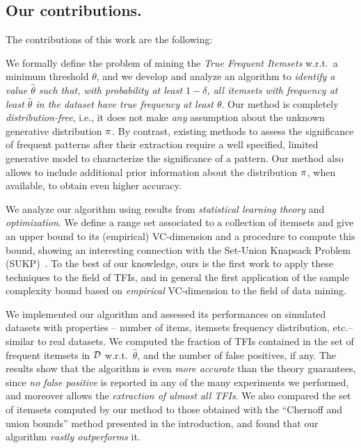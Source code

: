 \subsection{Our contributions.}
The contributions of this work are the following:
\begin{itemize*}
  \item We formally define the problem of mining the \emph{True Frequent
    Itemsets} w.r.t.~a minimum threshold $\theta$, and we develop and analyze an
    algorithm to \emph{identify a value $\hat{\theta}$ such that, with
    probability at least $1-\delta$, all itemsets
with frequency at least $\hat{\theta}$ in the dataset have true frequency
at least $\theta$}. Our method is completely \emph{distribution-free}, i.e., it
does not make \emph{any} assumption about the unknown generative distribution
$\pi$. By contrast, existing methods to assess the significance of frequent patterns after their
extraction require a well specified, limited generative model to characterize the
significance of a pattern. Our method also allows to include additional prior
information about the distribution $\pi$, when available, to obtain even
higher accuracy.
\item We analyze our algorithm using results from \emph{statistical learning
theory} and \emph{optimization}. We define a range set associated to a
collection of itemsets and give an upper bound to its (empirical) VC-dimension
and a procedure to compute this bound, showing an interesting connection with
the Set-Union Knapsack Problem (SUKP)~\citep{GoldschmidtNY94}. To the best of
our knowledge, ours is the first work to apply these techniques to the field of
TFIs, and in general the first application of the sample complexity bound based
on \emph{empirical} VC-dimension to the field of data mining. 
\item We implemented our algorithm and assessed its performances on simulated
  datasets with properties -- number of items, itemsets frequency distribution,
  etc.-- similar to real datasets. We computed the fraction of TFIs contained in
  the set of frequent itemsets in ${\cal D}$ w.r.t.~$\hat\theta$, and the number of
  false positives, if any. The results show that the algorithm is even
  \emph{more accurate} than the theory guarantees, since \emph{no false
  positive} is reported in any of the many experiments we performed,
  and moreover allows the \emph{extraction of almost all TFIs}. We also compared
  the set of itemsets computed by our method to those obtained with the
  ``Chernoff and union bounds'' method presented in the introduction, and found
  that our algorithm \emph{vastly outperforms} it.
\end{itemize*}



